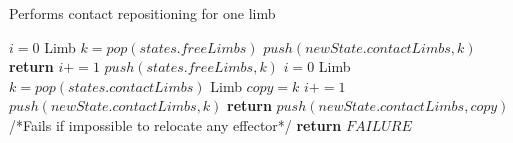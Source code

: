 \begin{algorithm}
\caption{Performs contact repositioning for one limb} \label{interpolate}
	\begin{algorithmic}[1]
		\State $i=0$
			\State Limb $k = pop(states.freeLimbs)$
				\State $push(newState.contactLimbs,k)$			
				\State \textbf{return}
			\Else
				\State $i+=1$
				\State $push(states.freeLimbs,k)$		
			\EndIf
		\EndWhile
		\State $i=0$
			\State Limb $k = pop(states.contactLimbs)$
			\State Limb $copy = k$
			\State $i+=1$
				\State $push(newState.contactLimbs,k)$			
				\State \textbf{return}
			\Else
				\State $push(newState.contactLimbs,copy)$	
			\EndIf
		\EndWhile
		/*Fails if impossible to relocate any effector*/
		\State \textbf{return} $FAILURE$
	\EndFunction
\end{algorithmic}
\label{alg:repo}
\end{algorithm}

